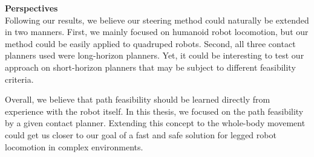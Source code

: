 \hfill \break
\hfill \break

\noindent\textbf{Perspectives}\\

Following our results, we believe our steering method could naturally be extended in two manners.
First, we mainly focused on humanoid robot locomotion, but our method could be easily applied to quadruped robots.
Second, all three contact planners used were long-horizon planners. Yet, it could be interesting to test our approach on short-horizon planners that may be subject to different feasibility criteria.


Overall, we believe that path feasibility should be learned directly from experience with the robot itself.
In this thesis, we focused on the path feasibility by a given contact planner. Extending this concept to the whole-body movement could get us closer to our goal of a fast and safe solution for legged robot locomotion in complex environments.

